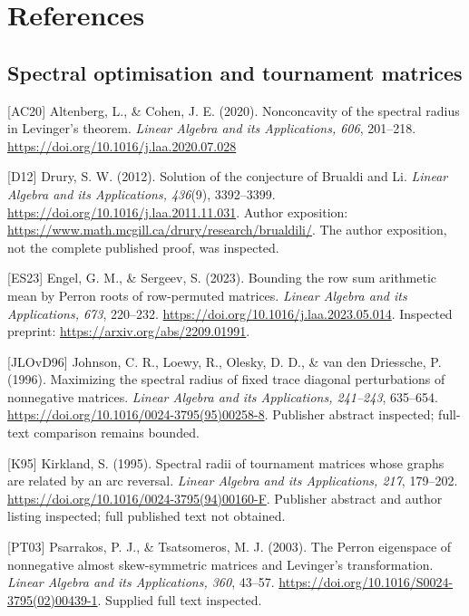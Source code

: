 \documentclass[
  11pt,
  a4paper,
]{article}
\begin{document}
\begingroup
\small

\section{References}\label{references}

\subsection{Spectral optimisation and tournament
matrices}\label{spectral-optimisation-and-tournament-matrices}

{[}AC20{]} Altenberg, L., \& Cohen, J. E. (2020). Nonconcavity of the
spectral radius in Levinger's theorem. \emph{Linear Algebra and its
Applications, 606}, 201--218.
\url{https://doi.org/10.1016/j.laa.2020.07.028}

{[}D12{]} Drury, S. W. (2012). Solution of the conjecture of Brualdi and
Li. \emph{Linear Algebra and its Applications, 436}(9), 3392--3399.
\url{https://doi.org/10.1016/j.laa.2011.11.031}. Author exposition:
\url{https://www.math.mcgill.ca/drury/research/brualdili/}. The author
exposition, not the complete published proof, was inspected.

{[}ES23{]} Engel, G. M., \& Sergeev, S. (2023). Bounding the row sum
arithmetic mean by Perron roots of row-permuted matrices. \emph{Linear
Algebra and its Applications, 673}, 220--232.
\url{https://doi.org/10.1016/j.laa.2023.05.014}. Inspected preprint:
\url{https://arxiv.org/abs/2209.01991}.

{[}JLOvD96{]} Johnson, C. R., Loewy, R., Olesky, D. D., \& van den
Driessche, P. (1996). Maximizing the spectral radius of fixed trace
diagonal perturbations of nonnegative matrices. \emph{Linear Algebra and
its Applications, 241--243}, 635--654.
\url{https://doi.org/10.1016/0024-3795(95)00258-8}. Publisher abstract
inspected; full-text comparison remains bounded.

{[}K95{]} Kirkland, S. (1995). Spectral radii of tournament matrices
whose graphs are related by an arc reversal. \emph{Linear Algebra and
its Applications, 217}, 179--202.
\url{https://doi.org/10.1016/0024-3795(94)00160-F}. Publisher abstract
and author listing inspected; full published text not obtained.

{[}PT03{]} Psarrakos, P. J., \& Tsatsomeros, M. J. (2003). The Perron
eigenspace of nonnegative almost skew-symmetric matrices and Levinger's
transformation. \emph{Linear Algebra and its Applications, 360}, 43--57.
\url{https://doi.org/10.1016/S0024-3795(02)00439-1}. Supplied full text
inspected.
\end{document}
